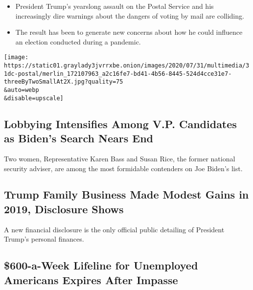 \begin{itemize}
\tightlist
\item
  President Trump's yearslong assault on the Postal Service and his
  increasingly dire warnings about the dangers of voting by mail are
  colliding.
\item
  The result has been to generate new concerns about how he could
  influence an election conducted during a pandemic.
\end{itemize}

\href{/2020/07/31/us/politics/trump-usps-mail-delays.html}{}

\texttt{[image: https://static01.graylady3jvrrxbe.onion/images/2020/07/31/multimedia/31dc-postal/merlin\_172107963\_a2c16fe7-bd41-4b56-8445-524d4cce31e7-threeByTwoSmallAt2X.jpg?quality=75\\\&auto=webp\\\&disable=upscale]}

\href{/2020/07/31/us/politics/joseph-biden-vice-president.html}{}

\hypertarget{lobbying-intensifies-among-vp-candidates-as-bidens-search-nears-end}{%
\subsection{Lobbying Intensifies Among V.P. Candidates as Biden's Search
Nears
End}\label{lobbying-intensifies-among-vp-candidates-as-bidens-search-nears-end}}

Two women, Representative Karen Bass and Susan Rice, the former national
security adviser, are among the most formidable contenders on Joe
Biden's list.

\href{/2020/07/31/business/trump-financial-disclosure.html}{}

\hypertarget{trump-family-business-made-modest-gains-in-2019-disclosure-shows}{%
\subsection{Trump Family Business Made Modest Gains in 2019, Disclosure
Shows}\label{trump-family-business-made-modest-gains-in-2019-disclosure-shows}}

A new financial disclosure is the only official public detailing of
President Trump's personal finances.

\href{/2020/07/31/world/coronavirus-covid-19.html}{}

\hypertarget{600-a-week-lifeline-for-unemployed-americans-expires-after-impasse}{%
\subsection{\$600-a-Week Lifeline for Unemployed Americans Expires After
Impasse}\label{600-a-week-lifeline-for-unemployed-americans-expires-after-impasse}}

